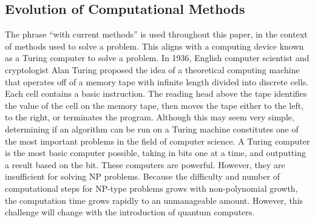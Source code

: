 \documentclass[10pt,journal,compsoc]{IEEEtran}
\begin{document}
\subsection{Evolution of Computational Methods}
 The phrase ``with current methods'' is used throughout this paper, in the context of methods used to solve a problem. This aligns with a computing device known as a Turing computer to solve a problem.  In 1936, English computer scientist and cryptologist Alan Turing proposed the idea of a theoretical computing machine that operates off of a memory tape with infinite length divided into discrete cells\cite{Turing}. Each cell contains a basic instruction. The reading head above the tape identifies the value of the cell on the memory tape, then moves the tape either to the left, to the right, or terminates the program. Although this may seem very simple, determining if an algorithm can be run on a Turing machine constitutes one of the most important problems in the field of computer science. A Turing computer is the most basic computer possible, taking in bits one at a time, and outputting a result based on the bit.  These computers are powerful. However, they are insufficient for solving NP problems. Because the difficulty and number of computational steps for NP-type problems grows with non-polynomial growth, the computation time grows rapidly to an unmanageable amount. However, this challenge will change with the introduction of quantum computers. 
\end{document}
